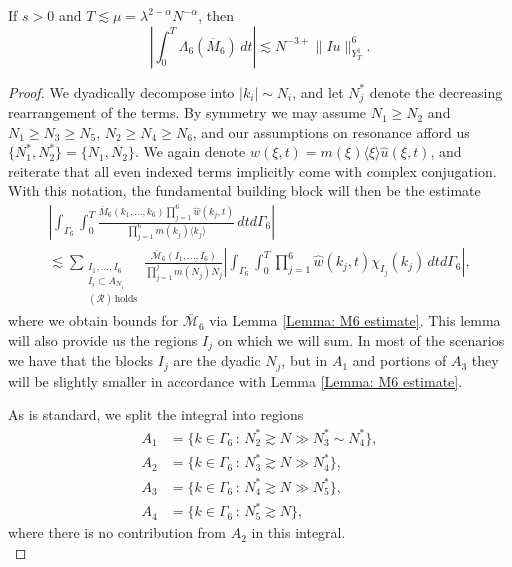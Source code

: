 \documentclass[10pt,a4paper]{amsart}
\begin{document}
\begin{lemma}\label{Lemma: M6 integral term}
If $s > 0$ and $T\lesssim \mu = \lambda^{2-\alpha}N^{-\alpha}$, then
\begin{equation}\label{Equation: L6 lemma integral bound}
\left|\int_0^T\Lambda_6(\overline{M}_6)\,dt\right|\lesssim N^{-3+}\|Iu\|_{Y^1_T}^6.
\end{equation}
\end{lemma}

\begin{proof}
    We dyadically decompose into $|k_i|\sim N_i$, and let $N_j^*$ denote the decreasing rearrangement of the terms. By symmetry we may assume $N_1\geq N_2$ and $N_1\geq N_3\geq N_5$, $N_2\geq N_4\geq N_6$, and our assumptions on resonance afford us $\{N_1^*, N_2^*\} = \{N_1, N_2\}$. We again denote $\widehat{w}(\xi,t) = m(\xi)\langle\xi\rangle \widehat{u}(\xi,t)$, and reiterate that all even indexed terms implicitly come with complex conjugation. With this notation, the fundamental building block will then be the estimate
    \begin{multline}\label{Equation: Resonant Base Estimate}
        \left|\int_{\Gamma_6}\int_0^T\frac{\overline{M}_6(k_1,\dots, k_6)\prod_{j=1}^6\widehat{w}(k_j,t)}{\prod_{j=1}^6m(k_j)\langle k_j\rangle}\,dtd\Gamma_6\right|\\
        \lesssim \sum_{\substack{I_1,\dots, I_6\\I_i\subset A_{N_i}\\(\mathcal{R})\,\mathrm{ holds}}}\frac{\overline{\mathcal{M}}_6(I_1,\dots, I_6)}{\prod_{j=1}^jm(N_j)N_j}\left|\int_{\Gamma_6}\int_0^T\prod_{j=1}^6\widehat{w}(k_j,t)\chi_{I_j}(k_j)\,dtd\Gamma_6\right|,
    \end{multline}
    where we obtain bounds for $\overline{\mathcal{M}}_6$ via Lemma \ref{Lemma: M6 estimate}. This lemma will also provide us the regions $I_j$ on which we will sum. In most of the scenarios we have that the blocks $I_j$ are the dyadic $N_j$, but in $A_1$ and portions of $A_3$ they will be slightly smaller in accordance with Lemma \ref{Lemma: M6 estimate}.

    As is standard, we split the integral into regions
    \begin{align*}
        A_1 &= \{k\in\Gamma_6\,:\,N_2^*\gtrsim N\gg N_3^*\sim N_4^*\},\\
        A_2 &= \{k\in \Gamma_6\,:\, N_3^*\gtrsim N\gg N_4^*\},\\
        A_3 &= \{k\in\Gamma_6\,:\,N_4^*\gtrsim N\gg N_5^*\},\\
        A_4 &= \{k\in\Gamma_6\,:\, N_5^*\gtrsim N\},
    \end{align*}
    where there is no contribution from $A_2$ in this integral.\\
    

\end{proof}
\end{document}
